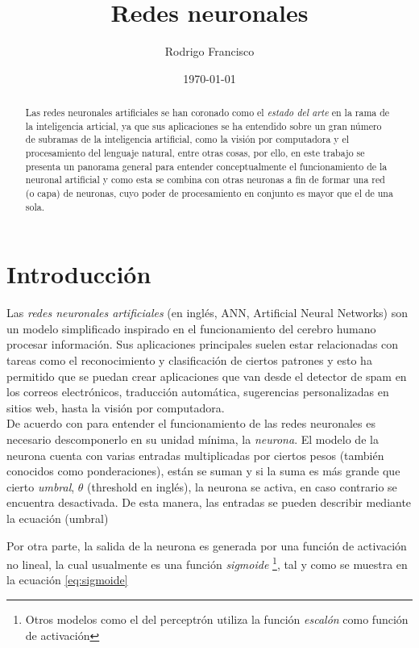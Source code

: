 \documentclass[twocolumn]{article}
\author{Rodrigo Francisco}
\title{Redes neuronales}
\date{\today}
\begin{document}
  \begin{abstract}
    Las redes neuronales artificiales se han coronado como el \textit{estado del
    arte} en la rama de la inteligencia articial, ya que sus aplicaciones se ha
    entendido sobre un gran número de subramas de la inteligencia artificial,
    como la visión por computadora y el procesamiento del lenguaje natural,
    entre otras cosas, por ello, en este trabajo se presenta un panorama general
    para entender conceptualmente el funcionamiento de la neuronal artificial y
    como esta se combina con otras neuronas a fin de formar una red (o capa) de
    neuronas, cuyo poder de procesamiento en conjunto es mayor que el de una
    sola.
  \end{abstract}

  \section{Introducción}

  Las \textit{redes neuronales artificiales} (en inglés, ANN, Artificial Neural
  Networks) son un modelo simplificado inspirado en el funcionamiento del
  cerebro humano procesar información. Sus aplicaciones principales suelen estar
  relacionadas con tareas como el reconocimiento y clasificación de ciertos
  patrones y esto ha permitido que se puedan crear aplicaciones que van desde el
  detector de spam en los correos electrónicos, traducción automática,
  sugerencias personalizadas en sitios web, hasta la visión por
  computadora.\\

  De acuerdo con \cite{savagenotes} para entender el funcionamiento de las redes
  neuronales es necesario descomponerlo en su unidad mínima, la
  \textit{neurona}.  El modelo
  de la neurona cuenta con varias entradas multiplicadas por ciertos pesos
  (también conocidos como ponderaciones), están se suman y si la suma es más
  grande que cierto \textit{umbral}, \(\theta\) (threshold en inglés), la neurona
  se activa, en caso contrario se encuentra desactivada. De esta manera, las
  entradas se pueden describir mediante la ecuación (umbral)


  Por otra parte, la salida de la neurona es generada por una función de
  activación no lineal, la cual usualmente es una función \textit{sigmoide}
  \footnote{Otros modelos como el del perceptrón utiliza la función
  \textit{escalón} como función de activación}, tal y como se muestra en la
  ecuación \ref{eq:sigmoide}
\end{document}

